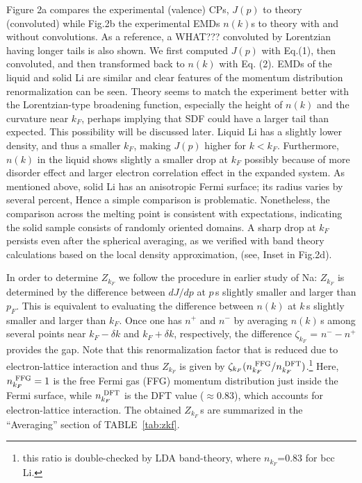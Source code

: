 \documentclass[twocolumn,showpacs,showkeys,fleqn,prl,superscriptaddress]{revtex4}%
\newcommand{\nn}[1]{\textnormal{ #1}}
\begin{document}
\vspace{10mm}

Figure 2a compares the experimental (valence) CPs, $J(p)$ to theory (convoluted) while Fig.2b the experimental EMDs $n(k)$s to theory with and without convolutions. 
As a reference, a WHAT??? convoluted by Lorentzian having longer tails is also shown. 
We first computed  $J(p)$ with Eq.(1), then convoluted, and then transformed back to $n(k)$ with Eq. (2). 
EMDs of the liquid and solid Li are similar and clear features of the momentum distribution renormalization can be seen.  
Theory seems to match the experiment better with the Lorentzian-type broadening function, especially the height of $n(k)$ and the curvature near $k_F$, perhaps implying that SDF could have a larger tail than expected.
This possibility will be discussed later. 
Liquid Li has a slightly lower density, and thus a smaller $k_F$, making $J(p)$ higher for $k < k_F$.
Furthermore, $n(k)$ in the liquid shows slightly a smaller drop at $ k_F $  possibly because of more disorder effect and  larger electron correlation effect in the expanded system.
As mentioned above, solid Li has an anisotropic Fermi surface; its radius varies by several percent\cite{saku95,schulke96}, Hence a simple comparison is problematic.
Nonetheless, the comparison across the melting point is consistent with expectations, indicating the solid sample consists of randomly oriented domains. 
A sharp drop at $k_F$ persists even after the spherical averaging, as we verified with band theory  calculations based on the local density approximation, (see, Inset in Fig.2d). 


In order to determine $Z_{k_F}$ we follow the procedure in earlier study of Na\cite{simo10}: $Z_{k_F}$ is determined by the difference between $dJ/dp$ at $p\,$s slightly smaller and larger than $p_F$. 
This is equivalent to evaluating the difference between $n(k)$ at $k\,$s slightly smaller and larger than $k_F$.
Once one has $n^+$ and $n^-$ by averaging $n(k)$\,s among several points near $k_F-\delta k$ and  $k_F+\delta k$, respectively, the difference $\zeta_{k_F}$ = $n^- - n^+$ provides the gap. 
Note that this renormalization factor that is reduced due to electron-lattice interaction and thus 
$Z_{k_F}$ is given by $\zeta_{k_F} (n_{k_F}^{\nn{FFG}}/n_{k_F}^{\nn{DFT}})$.\footnote{this ratio is double-checked by LDA band-theory, where $n_{k_F}$=0.83 for bcc Li.}
Here, $n_{k_F}^{\nn{FFG}}=1$ is the free Fermi gas (FFG) momentum distribution just inside the Fermi surface, while $n_{k_F}^{\nn{DFT}}$ is the DFT value ($\approx$0.83), which accounts for electron-lattice interaction. 
The obtained $Z_{k_F}\,$s are summarized in the ``Averaging'' section of TABLE~\ref{tab:zkf}.
\end{document}
